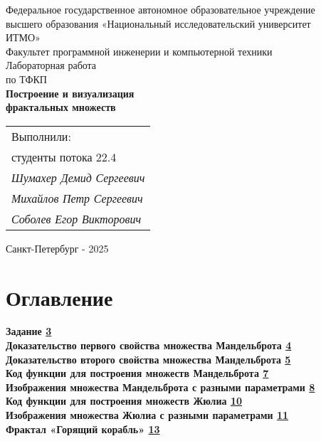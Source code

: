 \documentclass[a4paper,12pt]{article}
\begin{document}
\begin{titlepage}
    \centering
    \normalsize
    Федеральное государственное автономное образовательное учреждение \\
    высшего образования «Национальный исследовательский университет \\
    ИТМО» \\[0.8cm]
    Факультет программной инженерии и компьютерной техники \\[2.5cm]
    
    \LARGE
    Лабораторная работа \\
    \normalsize
    по ТФКП \\[1.2cm]
    
    \Large
    \textbf{Построение и визуализация \\ фрактальных множеств}
    
    \vfill
    
    \hfill
    \begin{tabular}{l}
        Выполнили: \\
        студенты потока 22.4 \\[0.3cm]
        \textit{Шумахер Демид Сергеевич} \\
        \textit{Михайлов Петр Сергеевич} \\
        \textit{Соболев Егор Викторович} \\
    \end{tabular}
    \hspace{1cm}
    
    \vfill
    
    \centering
    Санкт-Петербург - 2025
\end{titlepage}

\pagestyle{plain}
\setcounter{page}{2}

\section*{\textbf{Оглавление}}

{\bfseries
{} \quad Задание \hfill \hyperlink{sec:1}{3} \\
 \quad Доказательство первого свойства множества Мандельброта \hfill \hyperlink{sec:2}{4} \\
 \quad Доказательство второго свойства множества Мандельброта \hfill \hyperlink{sec:3}{5} \\
 \quad Код функции для построения множеств Мандельброта \hfill \hyperlink{sec:4}{7} \\
 \quad Изображения множества Мандельброта с разными параметрами \hfill \hyperlink{sec:5}{8} \\
 \quad Код функции для построения множеств Жюлиа \hfill \hyperlink{sec:6}{10} \\
 \quad Изображения множества Жюлиа с разными параметрами \hfill \hyperlink{sec:7}{11} \\
 \quad Фрактал «Горящий корабль» \hfill \hyperlink{sec:8}{13} \\
}
\end{document}

